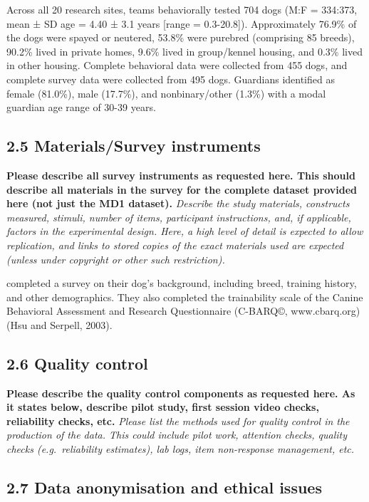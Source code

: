 \documentclass[
  man,floatsintext]{apa6}
\begin{document}
Across all 20 research sites, teams behaviorally tested 704 dogs (M:F = 334:373, mean ± SD age = 4.40 ± 3.1 years {[}range = 0.3-20.8{]}). Approximately 76.9\% of the dogs were spayed or neutered, 53.8\% were purebred (comprising 85 breeds), 90.2\% lived in private homes, 9.6\% lived in group/kennel housing, and 0.3\% lived in other housing. Complete behavioral data were collected from 455 dogs, and complete survey data were collected from 495 dogs. Guardians identified as female (81.0\%), male (17.7\%), and nonbinary/other (1.3\%) with a modal guardian age range of 30-39 years.

\hypertarget{materialssurvey-instruments}{%
\subsection{2.5 Materials/Survey instruments}\label{materialssurvey-instruments}}

\textbf{Please describe all survey instruments as requested here. This should describe all materials in the survey for the complete dataset provided here (not just the MD1 dataset).}
\emph{Describe the study materials, constructs measured, stimuli, number of items, participant instructions, and, if applicable, factors in the experimental design. Here, a high level of detail is expected to allow replication, and links to stored copies of the exact materials used are expected (unless under copyright or other such restriction).}

completed a survey on their dog's background, including breed, training history, and other demographics. They also completed the trainability scale of the Canine Behavioral Assessment and Research Questionnaire (C-BARQ©, www.cbarq.org)(Hsu and Serpell, 2003).

\hypertarget{quality-control}{%
\subsection{2.6 Quality control}\label{quality-control}}

\textbf{Please describe the quality control components as requested here. As it states below, describe pilot study, first session video checks, reliability checks, etc.}
\emph{Please list the methods used for quality control in the production of the data. This could include pilot work, attention checks, quality checks (e.g.~reliability estimates), lab logs, item non-response management, etc.}

\hypertarget{data-anonymisation-and-ethical-issues}{%
\subsection{2.7 Data anonymisation and ethical issues}\label{data-anonymisation-and-ethical-issues}}
\end{document}
